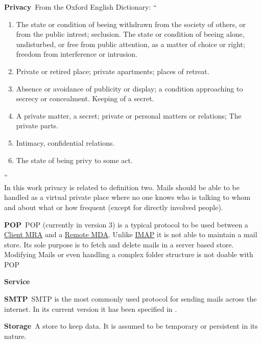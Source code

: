 \documentclass[a4paper,appendixprefix,pdfusetitle,twocolumn,draft,8pt]{scrbook}
\newenvironment{entry}{\par\leavevmode\hangpara{1.5mm}{1}\ignorespaces}{\RaggedRight\par}
\newcommand*{\mainentry}[2]{{\bfseries{#1\label{def:#1}}}~#2\par}
\newcommand*{\defref}[1]{\hyperref[def:#1]{#1}}
\begin{document}
\begin{entry}
  \mainentry{Privacy}{From the Oxford English Dictionary: ``
    \begin{enumerate}
      \item The state or condition of beeing withdrawn from the society of others, or from the public intrest; seclusion. The state or condition of beeing alone, undisturbed, or free from public attention, as a matter of choice or right; freedom from interference or intrusion.
      \item Private or retired place; private apartments; places of retreat.
      \item Absence or avoidance of publicity or display; a condition approaching to secrecy or concealment. Keeping of a secret.
      \item A private matter, a secret; private or personal matters or relations; The private parts.
      \item Intimacy, confidential relations.
      \item The state of being privy to some act.
    \end{enumerate}''\cite[FIXME]{OXFORD}\\
    In this work privacy is related to definition two. Mails should be able to be handled as a virtual private place where no one knows who is talking to whom and about what or how frequent (except for directly involved people).
  }
\end{entry}

\begin{entry}
  \mainentry{POP}{POP (currently in version 3) is a typical protocol to be used between a \defref{Client MRA} and a \defref{Remote MDA}. Unlike \defref{IMAP} it is not able to maintain a mail store. Its sole purpose is to fetch and delete mails in a server based store. Modifying Mails or even handling a complex folder structure is not doable with POP}
\end{entry}

\begin{entry}
  \mainentry{Service}{}
\end{entry}

\begin{entry}
  \mainentry{SMTP}{SMTP is the most commonly used protocol for sending mails across the internet. In its current version it has been specified in \cite{RFC5321}.}
\end{entry}

\begin{entry}
  \mainentry{Storage}{A store to keep data. It is assumed to be temporary or persistent in its nature.}
\end{entry}
\end{document}

